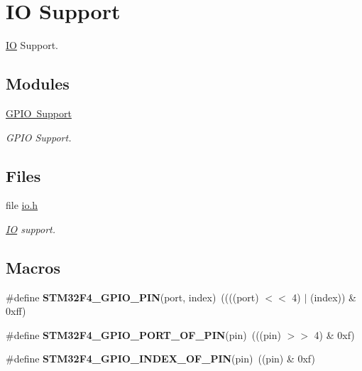 \hypertarget{group__stm32f4__io}{}\section{IO Support}
\label{group__stm32f4__io}


\mbox{\hyperlink{structIO}{IO}} Support.  


\subsection*{Modules}
\begin{DoxyCompactItemize}
\item 
\mbox{\hyperlink{group__stm32f4__gpio}{G\+P\+I\+O Support}}
\begin{DoxyCompactList}\small\item\em G\+P\+IO Support. \end{DoxyCompactList}\end{DoxyCompactItemize}
\subsection*{Files}
\begin{DoxyCompactItemize}
\item 
file \mbox{\hyperlink{bsps_2arm_2stm32f4_2include_2bsp_2io_8h}{io.\+h}}
\begin{DoxyCompactList}\small\item\em \mbox{\hyperlink{structIO}{IO}} support. \end{DoxyCompactList}\end{DoxyCompactItemize}
\subsection*{Macros}
\begin{DoxyCompactItemize}
\item 
\mbox{\label{group__stm32f4__io_ga867ba6967bc9a6684cf65d958991dfdc}} 
\#define {\bfseries S\+T\+M32\+F4\+\_\+\+G\+P\+I\+O\+\_\+\+P\+IN}(port,  index)~((((port) $<$$<$ 4) $\vert$ (index)) \& 0xff)
\item 
\mbox{\label{group__stm32f4__io_ga065ee78229592ed51b127bd71ba03894}} 
\#define {\bfseries S\+T\+M32\+F4\+\_\+\+G\+P\+I\+O\+\_\+\+P\+O\+R\+T\+\_\+\+O\+F\+\_\+\+P\+IN}(pin)~(((pin) $>$$>$ 4) \& 0xf)
\item 
\mbox{\label{group__stm32f4__io_ga448cd10bf878a6766d265524f604ef9d}} 
\#define {\bfseries S\+T\+M32\+F4\+\_\+\+G\+P\+I\+O\+\_\+\+I\+N\+D\+E\+X\+\_\+\+O\+F\+\_\+\+P\+IN}(pin)~((pin) \& 0xf)
\end{DoxyCompactItemize}
